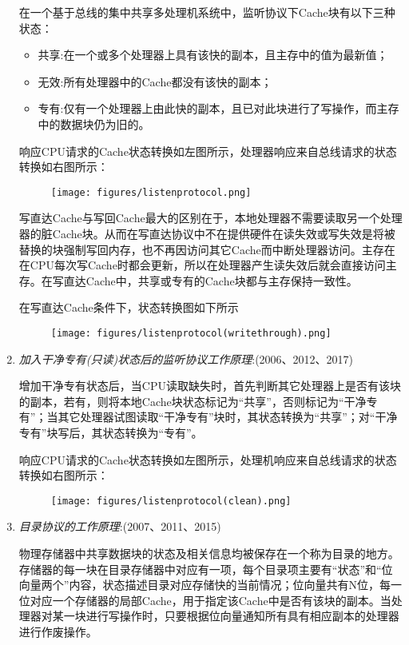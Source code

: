 \documentclass[a4paper]{ctexart}
\begin{document}
\begin{enumerate}
  在一个基于总线的集中共享多处理机系统中，监听协议下Cache块有以下三种状态：
  \begin{itemize}
    \item 共享:在一个或多个处理器上具有该快的副本，且主存中的值为最新值；
    \item 无效:所有处理器中的Cache都没有该快的副本；
    \item 专有:仅有一个处理器上由此快的副本，且已对此块进行了写操作，而主存中的数据块仍为旧的。
  \end{itemize}
  
  
  响应CPU请求的Cache状态转换如左图所示，处理器响应来自总线请求的状态转换如右图所示：
  \begin{figure}[!htbp]
    \centering
    \texttt{[image: figures/listenprotocol.png]}
  \end{figure}
  
  写直达Cache与写回Cache最大的区别在于，本地处理器不需要读取另一个处理器的脏Cache块。从而在写直达协议中不在提供硬件在读失效或写失效是将被替换的块强制写回内存，也不再因访问其它Cache而中断处理器访问。主存在在CPU每次写Cache时都会更新，所以在处理器产生读失效后就会直接访问主存。在写直达Cache中，共享或专有的Cache块都与主存保持一致性。
  
  在写直达Cache条件下，状态转换图如下所示
  \begin{figure}[!htbp]
    \centering
    \texttt{[image: figures/listenprotocol(writethrough).png]}
  \end{figure}
  
  \item \emph{加入干净专有(只读)状态后的监听协议工作原理}:(2006、2012、2017)
  
  增加干净专有状态后，当CPU读取缺失时，首先判断其它处理器上是否有该块的副本，若有，则将本地Cache块状态标记为“共享”，否则标记为“干净专有”；当其它处理器试图读取“干净专有”块时，其状态转换为“共享”；对“干净专有”块写后，其状态转换为“专有”。
  
  响应CPU请求的Cache状态转换如左图所示，处理机响应来自总线请求的状态转换如右图所示：
  \begin{figure}[!htbp]
    \centering
    \texttt{[image: figures/listenprotocol(clean).png]}
  \end{figure}
  
  
  \item \emph{目录协议的工作原理}:(2007、2011、2015)
  
  物理存储器中共享数据块的状态及相关信息均被保存在一个称为目录的地方。存储器的每一块在目录存储器中对应有一项，每个目录项主要有“状态”和“位向量两个”内容，状态描述目录对应存储快的当前情况；位向量共有N位，每一位对应一个存储器的局部Cache，用于指定该Cache中是否有该块的副本。当处理器对某一块进行写操作时，只要根据位向量通知所有具有相应副本的处理器进行作废操作。
  

\end{enumerate}
\end{document}
